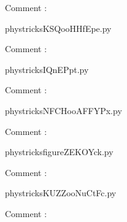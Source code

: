     Comment : 

    \clearpage
    


    \newcommand{\CaptionFigKSQooHHfEpe}{<+Type your caption here+>}
    \begin{center}
        
    \end{center}
    phystricksKSQooHHfEpe.py

    Comment : 

    \clearpage
    


    \newcommand{\CaptionFigIQnEPpt}{<+Type your caption here+>}
    \begin{center}
        
    \end{center}
    phystricksIQnEPpt.py

    Comment : 

    \clearpage
    


    \newcommand{\CaptionFigNFCHooAFFYPx}{<+Type your caption here+>}
    \begin{center}
        
    \end{center}
    phystricksNFCHooAFFYPx.py

    Comment : 

    \clearpage
    


    \newcommand{\CaptionFigfigureZEKOYck}{<+Type your caption here+>}
    \begin{center}
        
    \end{center}
    phystricksfigureZEKOYck.py

    Comment : 

    \clearpage
    


    \newcommand{\CaptionFigKUZZooNuCtFc}{<+Type your caption here+>}
    \begin{center}
        
    \end{center}
    phystricksKUZZooNuCtFc.py

    Comment : 

    \clearpage
    

